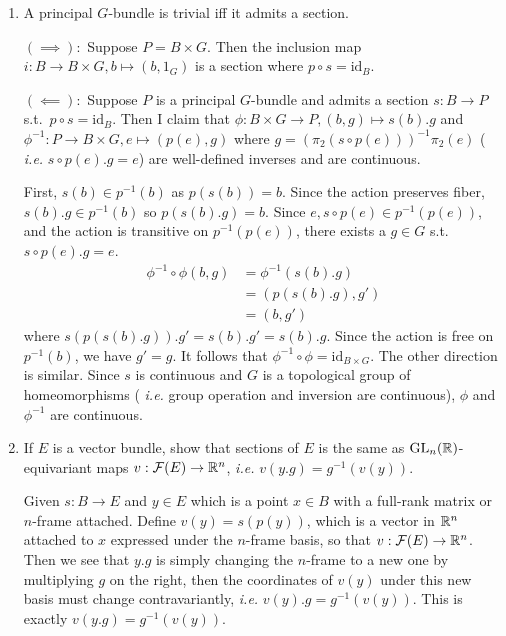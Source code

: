 \documentclass[12pt]{article}
\begin{document}
\begin{problem}[8]
	\begin{enumerate}[label=(\arabic*)]
		\item A principal $ G$-bundle is trivial iff it admits a section.

 $ (\implies):$ Suppose $ P = B \times G$. Then the inclusion map $ i: B \to B \times G, b \mapsto (b,1_G)$ is a section where $ p \circ s= \text{id}_{ B}$.
 
 $ (\impliedby):$ Suppose $ P$ is a principal  $ G$-bundle and admits a section  $ s: B \to P$ s.t.\ $ p \circ s = \text{id}_{ B}$. Then I claim that $ \phi: B \times G \to P, (b,g) \mapsto s(b).g$ and $ \phi ^{-1}: P \to B \times G, e \mapsto (p(e), g)$ where $ g=(\pi_2 (s \circ p(e)))^{-1} \pi_2(e)$ ( \emph{i.e.} $ s \circ p(e).g =e$) are well-defined inverses and are continuous.

 First, $ s(b) \in p^{-1}(b)$ as $ p(s(b)) = b$. Since the action preserves fiber, $ s(b).g \in p^{-1}(b)$ so $ p (s(b).g) =b$. Since $e, s \circ p(e) \in p^{-1}(p(e))$, and the action is transitive on $ p^{-1}(p(e))$, there exists a  $ g \in G$ s.t.\ $ s \circ p(e).g = e$.
\begin{align*}
	\phi ^{-1} \circ \phi(b,g) &=\phi ^{-1} (s(b).g) \\
	&= (p(s(b).g), g')\\
	&= (b,g') 
\end{align*}
where $ s ( p(s(b).g)).g' = s(b).g'= s(b).g$. Since the action is free on $ p^{-1}(b)$, we have $ g'=g$. It follows that $ \phi ^{-1} \circ \phi = \text{id}_{ B \times G}$. The other direction is similar. Since $ s$ is continuous and $ G$ is a topological group of homeomorphisms ( \emph{i.e.} group operation and inversion are continuous),  $ \phi$ and $ \phi ^{-1}$ are continuous. 
\item If $ E$ is a vector bundle, show that sections of  $ E$ is the same as  $ \text{GL}_{ n}(\mathbb{R}) $-equivariant maps $ v: \mathcal{ F}(E) \to \mathbb{R}^{n}$, \emph{i.e.} $ v(y.g) = g^{-1}(v(y))$.

	Given $ s : B \to E$ and $ y \in E$ which is a point $ x \in B$ with a full-rank matrix or $ n$-frame attached. Define $ v(y) = s(p(y))$, which is a vector in $ \mathbb{R}^{n}$ attached to $ x$ expressed under the $ n$-frame basis, so that $ v: \mathcal{ F}(E) \to \mathbb{R}^{n}$. Then we see that  $ y.g$ is simply changing the  $ n$-frame to a new one by multiplying $ g$ on the right, then the coordinates of $ v(y)$ under this new basis must change contravariantly,  \emph{i.e.} $ v(y).g = g^{-1}(v(y))$. This is exactly $ v(y.g) = g^{-1}(v(y))$.


\end{enumerate}
\end{problem}
\end{document}
